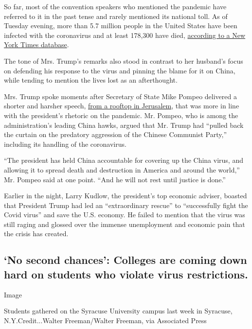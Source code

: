 So far, most of the convention speakers who mentioned the pandemic have
referred to it in the past tense and rarely mentioned its national toll.
As of Tuesday evening, more than 5.7 million people in the United States
have been infected with the coronavirus and at least 178,300 have died,
\href{https://www.nytimes3xbfgragh.onion/interactive/2020/us/coronavirus-us-cases.html}{according
to a New York Times database}.

The tone of Mrs. Trump's remarks also stood in contrast to her husband's
focus on defending his response to the virus and pinning the blame for
it on China, while tending to mention the lives lost as an afterthought.

Mrs. Trump spoke moments after Secretary of State Mike Pompeo delivered
a shorter and harsher speech,
\href{https://www.nytimes3xbfgragh.onion/2020/08/24/world/middleeast/pompeo-jerusalem-rnc.html}{from
a rooftop in Jerusalem}, that was more in line with the president's
rhetoric on the pandemic. Mr. Pompeo, who is among the administration's
leading China hawks, argued that Mr. Trump had ``pulled back the curtain
on the predatory aggression of the Chinese Communist Party,'' including
its handling of the coronavirus.

``The president has held China accountable for covering up the China
virus, and allowing it to spread death and destruction in America and
around the world,'' Mr. Pompeo said at one point. ``And he will not rest
until justice is done.''

Earlier in the night, Larry Kudlow, the president's top economic
adviser, boasted that President Trump had led an ``extraordinary
rescue'' to ``successfully fight the Covid virus'' and save the U.S.
economy. He failed to mention that the virus was still raging and
glossed over the immense unemployment and economic pain that the crisis
has created.

\hypertarget{no-second-chances-colleges-are-coming-down-hard-on-students-who-violate-virus-restrictions}{%
\subsection{`No second chances': Colleges are coming down hard on
students who violate virus
restrictions.}\label{no-second-chances-colleges-are-coming-down-hard-on-students-who-violate-virus-restrictions}}

Image

Students gathered on the Syracuse University campus last week in
Syracuse, N.Y.Credit...Walter Freeman/Walter Freeman, via Associated
Press

